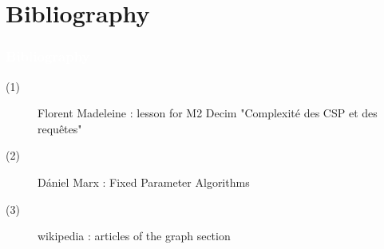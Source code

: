 \documentclass[8pt]{beamer}
\begin{document}



\section{Bibliography}

\begin{frame}
  \frametitle{ \textcolor{white}{Bibliography}}

  \begin{description}
  \item[(1)] Florent Madeleine : lesson for M2 Decim "Complexité des CSP et des requêtes"
  \item[(2)] Dániel Marx : Fixed Parameter Algorithms
  \item[(3)] wikipedia : articles of the graph section
    \end{description}
\end{frame}
\end{document}
